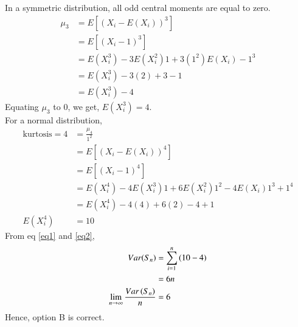 \documentclass[journal,12pt,twocolumn]{IEEEtran}
\begin{document}
In a symmetric distribution, all odd central moments are equal to zero. 
\begin{align*}
\mu_3  &= E\left[(X_i-E(X_i))^3\right] \\
    &=E\left[(X_i-1)^3\right] \\
   &= E(X_i^3) - 3E(X_i^2)1+3(1^2)E(X_i) - 1^3\\
    &= E(X_i^3) - 3(2) + 3 - 1\\
    &= E(X_i^3) - 4
\end{align*}
Equating $\mu_3$ to 0, we get,  $E(X_i^3) = 4.$\\
For a normal distribution, \begin{align}
    \text{kurtosis} = 4 
    &= \frac{\mu_4}{1^2} \nonumber\\
    &=  E\left[(X_i-E(X_i))^4\right]\nonumber\\
    &= E\left[(X_i-1)^4\right] \nonumber\\
    &= E(X_i^4) - 4E(X_i^3)1 + 6E(X_i^2)1^2 - 4E(X_i)1^3 + 1^4\nonumber\\
    &= E(X_i^4) - 4(4) + 6(2) - 4 +1 \nonumber\\
     E(X_i^4) &= 10 \label{eq2}
\end{align}
 From eq \ref{eq1} and \ref{eq2},
 \begin{align*}
     Var(S_n) &= \sum_{i=1}^n{(10-4)}\\
     &= 6n\\
     \lim_{n \to \infty}{\frac{Var\left(S_{n}\right)}{n}} &= 6
 \end{align*}
 Hence, option B is correct.
\end{document}
